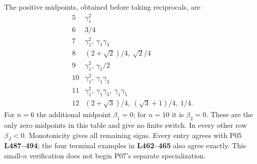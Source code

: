 \documentclass[11pt]{article}
\newcommand{\lin}[1]{\textbf{L#1}}
\begin{document}
The positive midpoints, obtained before taking reciprocals, are
\[
\begin{array}{c|l}
5&\gamma_1^2\\
6&3/4\\
7&\gamma_1^2,\ \gamma_1\gamma_3\\
8&(2+\sqrt2)/4,\ \sqrt2/4\\
9&\gamma_1^2,\ \gamma_1/2\\
10&\gamma_1^2,\ \gamma_1\gamma_3\\
11&\gamma_1^2,\ \gamma_1\gamma_3,\ \gamma_1\gamma_5\\
12&(2+\sqrt3)/4,\ (\sqrt3+1)/4,\ 1/4.
\end{array}
\]
For $n=6$ the additional midpoint $\beta_1=0$; for $n=10$ it is
$\beta_2=0$. These are the only zero midpoints in this table and give
no finite switch. In every other row $\beta_J<0$. Monotonicity gives
all remaining signs. Every entry agrees with P05 \lin{487--494};
the four terminal examples in \lin{462--465} also agree exactly.
This small-$n$ verification does not begin P07's separate specialization.
\end{document}
